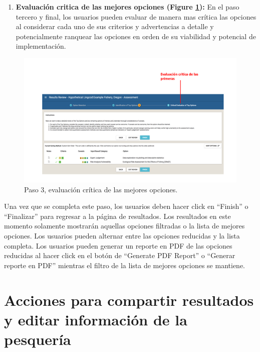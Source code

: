 \documentclass[
  11pt,
]{book}
\providecommand{\tightlist}{%
  \setlength{\itemsep}{0pt}\setlength{\parskip}{0pt}}
\begin{document}
\begin{enumerate}
\def\labelenumi{\arabic{enumi}.}
\setcounter{enumi}{2}
\tightlist
\item
  \textbf{Evaluación critica de las mejores opciones (Figure \ref{fig:review-step-3}):} En el paso tercero y final, los usuarios pueden evaluar de manera mas crítica las opciones al considerar cada uno de sus criterios y advertencias a detalle y potencialmente ranquear las opciones en orden de su viabilidad y potencial de implementación.
\end{enumerate}

\begin{figure}

{\centering \includegraphics[width=0.95\linewidth]{images/review-step-3-es} 

}

\caption{Paso 3, evaluación crítica de las mejores opciones.}\label{fig:review-step-3}
\end{figure}

Una vez que se completa este paso, los usuarios deben hacer click en ``Finish'' o ``Finalizar'' para regresar a la página de resultados. Los resultados en este momento solamente mostrarán aquellas opciones filtradas o la lista de mejores opciones. Los usuarios pueden alternar entre las opciones reducidas y la lista completa. Los usuarios pueden generar un reporte en PDF de las opciones reducidas al hacer click en el botón de ``Generate PDF Report'' o ``Generar reporte en PDF'' mientras el filtro de la lista de mejores opciones se mantiene.

\hypertarget{Results-Actions}{%
\section{Acciones para compartir resultados y editar información de la pesquería}\label{Results-Actions}}
\end{document}
